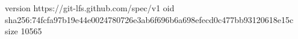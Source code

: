 version https://git-lfs.github.com/spec/v1
oid sha256:74fcfa97b19e44e0024780726e3ab6f696b6a698efecd0c477bb93120618e15c
size 10565
